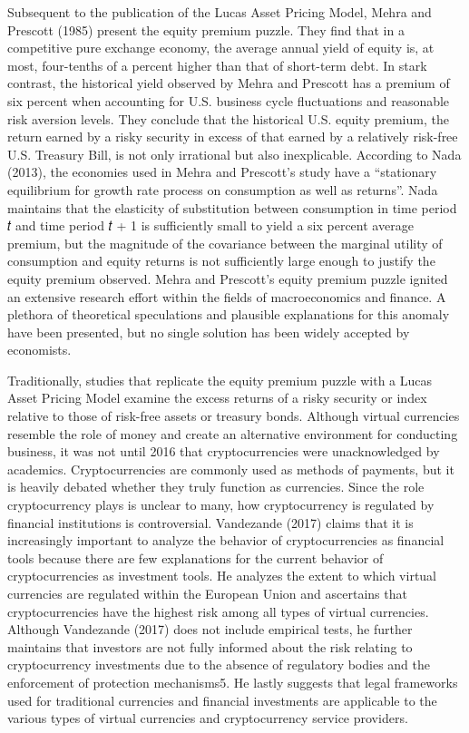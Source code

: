 \documentclass[]{article}
\begin{document}
Subsequent to the publication of the Lucas Asset Pricing Model, Mehra
and Prescott (1985) present the equity premium puzzle. They find that in
a competitive pure exchange economy, the average annual yield of equity
is, at most, four-tenths of a percent higher than that of short-term
debt. In stark contrast, the historical yield observed by Mehra and
Prescott has a premium of six percent when accounting for U.S. business
cycle fluctuations and reasonable risk aversion levels. They conclude
that the historical U.S. equity premium, the return earned by a risky
security in excess of that earned by a relatively risk-free U.S.
Treasury Bill, is not only irrational but also inexplicable. According
to Nada (2013), the economies used in Mehra and Prescott's study have a
``stationary equilibrium for growth rate process on consumption as well
as returns''. Nada maintains that the elasticity of substitution between
consumption in time period 𝑡 and time period 𝑡 + 1 is sufficiently small
to yield a six percent average premium, but the magnitude of the
covariance between the marginal utility of consumption and equity
returns is not sufficiently large enough to justify the equity premium
observed. Mehra and Prescott's equity premium puzzle ignited an
extensive research effort within the fields of macroeconomics and
finance. A plethora of theoretical speculations and plausible
explanations for this anomaly have been presented, but no single
solution has been widely accepted by economists.

Traditionally, studies that replicate the equity premium puzzle with a
Lucas Asset Pricing Model examine the excess returns of a risky security
or index relative to those of risk-free assets or treasury bonds.
Although virtual currencies resemble the role of money and create an
alternative environment for conducting business, it was not until 2016
that cryptocurrencies were unacknowledged by academics. Cryptocurrencies
are commonly used as methods of payments, but it is heavily debated
whether they truly function as currencies. Since the role cryptocurrency
plays is unclear to many, how cryptocurrency is regulated by financial
institutions is controversial. Vandezande (2017) claims that it is
increasingly important to analyze the behavior of cryptocurrencies as
financial tools because there are few explanations for the current
behavior of cryptocurrencies as investment tools. He analyzes the extent
to which virtual currencies are regulated within the European Union and
ascertains that cryptocurrencies have the highest risk among all types
of virtual currencies. Although Vandezande (2017) does not include
empirical tests, he further maintains that investors are not fully
informed about the risk relating to cryptocurrency investments due to
the absence of regulatory bodies and the enforcement of protection
mechanisms5. He lastly suggests that legal frameworks used for
traditional currencies and financial investments are applicable to the
various types of virtual currencies and cryptocurrency service
providers.
\end{document}
